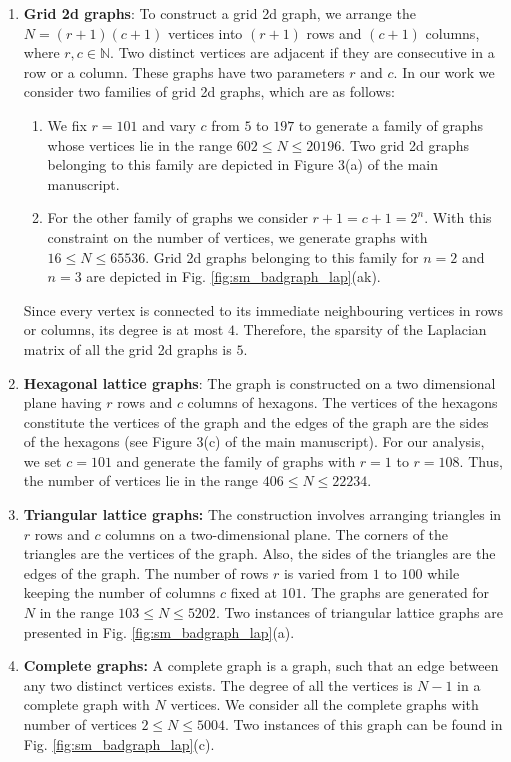 \documentclass[%
 reprint,
 superscriptaddress,
 amsmath,amssymb,
 aps,
 pra,
floatfix,
nofootinbib,
]{revtex4-2}
\theoremstyle{definition}
\theoremstyle{remark}
\begin{document}
\begin{appendix}
\begin{enumerate}
		\item 
		\textbf{Grid 2d  graphs}: To construct a grid 2d graph, we arrange the $N= (r+1)(c+1)$ vertices into $(r+1)$ rows and $(c+1)$ columns, where $r, c \in \mathbb{N}$. Two distinct vertices are adjacent if they are consecutive in a row or a column. These graphs have two parameters $r$ and $c$. In our work we consider two families of grid 2d graphs, which are as follows: 
		\begin{enumerate}
			\item 
			We fix $r = 101$ and vary $c$ from $5$ to $197$ to generate a family of graphs whose vertices lie in the range $602 \leq N \leq 20196$. Two grid 2d graphs belonging to this family are depicted in Figure 3(a) of the main manuscript.
			\item 
			For the other family of graphs we consider $r + 1 = c+ 1 = 2^n$. With this constraint on the number of vertices, we generate graphs with $16 \leq N \leq 65536$. Grid 2d graphs belonging to this family for $n=2$ and $n=3$ are depicted in Fig. \ref{fig:sm_badgraph_lap}(ak).
		\end{enumerate}
		Since every vertex is connected to its immediate neighbouring vertices in rows or columns, its degree is at most $4$. Therefore, the sparsity of the Laplacian matrix of all the grid 2d graphs is $5$.
		
		\item 
		\textbf{Hexagonal lattice graphs}: 
		The graph is constructed on a two dimensional plane having $r$ rows and $c$ columns of hexagons. The vertices of the hexagons constitute the vertices of the graph and the edges of the graph are the sides of the hexagons (see Figure 3(c) of the main manuscript). For our analysis, we set $c=101$ and generate the family of graphs with $r=1$ to $r=108$. Thus, the number of vertices lie in the range $406 \leq N \leq 22234$.
		
		\item 
		\textbf{Triangular lattice graphs:} 
		The construction involves arranging triangles in $r$ rows and $c$ columns on a two-dimensional plane. The corners of the triangles are the vertices of the graph.  Also, the sides of the triangles are the edges of the graph. The number of rows $r$ is varied from $1$ to $100$ while keeping the number of columns $c$ fixed at $101$. The graphs are generated for $N$ in the range $103 \leq N \leq 5202$. Two instances of triangular lattice graphs are presented in Fig. \ref{fig:sm_badgraph_lap}(a).
		
		\item 
		\textbf{Complete graphs:} A complete graph is a graph, such that an edge between any two distinct vertices exists. The degree of all the vertices is $N-1$ in a complete graph with $N$ vertices. We consider all the complete graphs with number of vertices  $2 \leq N \leq 5004$. Two instances of this graph can be found in Fig. \ref{fig:sm_badgraph_lap}(c).
		

\end{enumerate}
\end{appendix}
\end{document}
